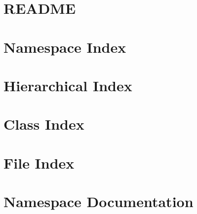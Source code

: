 \documentclass[twoside]{book}
\newcommand{\+}{\discretionary{\mbox{\scriptsize$\hookleftarrow$}}{}{}}
\begin{document}
\chapter{R\+E\+A\+D\+ME}
\label{md_smacc_sm_reference_library_sm_viewer_sim_README}
\hypertarget{md_smacc_sm_reference_library_sm_viewer_sim_README}{}

\chapter{Namespace Index}

\chapter{Hierarchical Index}

\chapter{Class Index}

\chapter{File Index}

\chapter{Namespace Documentation}































\end{document}

